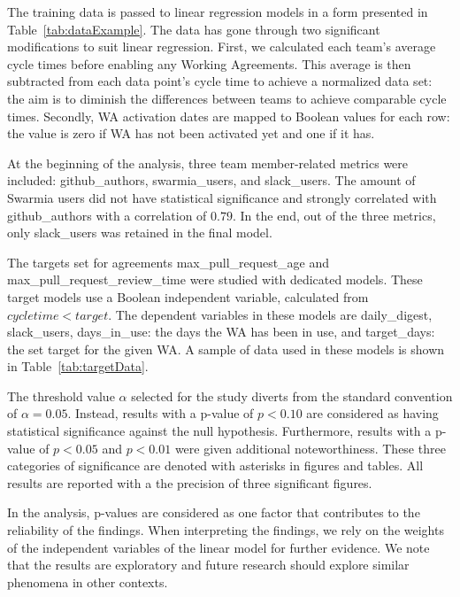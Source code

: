 The training data is passed to linear regression models in a form presented in Table~\ref{tab:dataExample}. The data has gone through two significant modifications to suit linear regression. First, we calculated each team's average cycle times before enabling any Working Agreements. This average is then subtracted from each data point's cycle time to achieve a normalized data set: the aim is to diminish the differences between teams to achieve comparable cycle times. Secondly, WA activation dates are mapped to Boolean values for each row: the value is zero if WA has not been activated yet and one if it has.

At the beginning of the analysis, three team member-related metrics were included: github\_authors, swarmia\_users, and slack\_users. The amount of Swarmia users did not have statistical significance and strongly correlated with github\_authors with a correlation of $0.79$. In the end, out of the three metrics, only slack\_users was retained in the final model.

The targets set for agreements max\_pull\_request\_age and max\_pull\_re\-quest\_re\-view\_time were studied with dedicated models. These target models use a Boolean independent variable, calculated from $cycletime<target$. The dependent variables in these models are daily\_digest, slack\_users, days\_in\_use: the days the WA has been in use, and tar\-get\_days: the set target for the given WA. A sample of data used in these models is shown in Table~\ref{tab:targetData}.



The threshold value $\alpha$ selected for the study diverts from the standard convention of $\alpha=0.05$. Instead, results with a p-value of $p<0.10$ are considered as having statistical significance against the null hypothesis. Furthermore, results with a p-value of $p<0.05$ and $p<0.01$ were given additional noteworthiness. These three categories of significance are denoted with asterisks in figures and tables. All results are reported with a the precision of three significant figures.

In the analysis, p-values are considered as one factor that contributes to the reliability of the findings. When interpreting the findings, we rely on the weights of the independent variables of the linear model for further evidence. We note that the results are exploratory and future research should explore similar phenomena in other contexts.